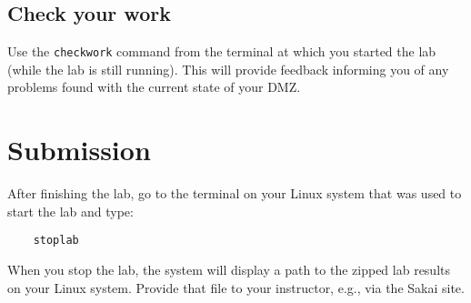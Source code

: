 \subsection{Check your work}
Use the {\tt checkwork} command from the terminal at which you started the lab (while the lab is still
running).  This will provide feedback informing you of any problems found with the current state of your DMZ.

\section{Submission}
After finishing the lab, go to the terminal on your Linux system that was used to start the lab and type:
\begin{verbatim}
    stoplab 
\end{verbatim}
When you stop the lab, the system will display a path to the zipped lab results on your Linux system.  Provide that file to 
your instructor, e.g., via the Sakai site.


